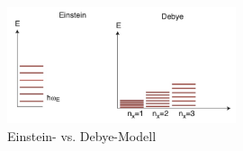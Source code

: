 \begin{figure}[H]
 \centering
 \includegraphics[width=0.6\textwidth]{resources/15-06-2015/Einstein_Debye.jpeg}
 \caption{Einstein- vs. Debye-Modell}
\end{figure}
\newpage